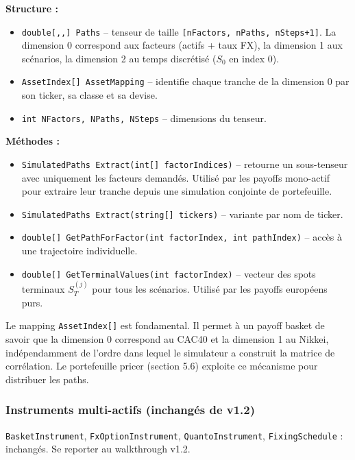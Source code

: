 \documentclass[a4paper,11pt]{article}
\newcommand{\cs}[1]{\texttt{\color{codeinline}#1}}
\begin{document}
\textbf{Structure :}
\begin{itemize}[leftmargin=1.5em]
  \item \cs{double[,,] Paths} -- tenseur de taille \cs{[nFactors, nPaths, nSteps+1]}.
        La dimension 0 correspond aux facteurs (actifs + taux FX), la dimension 1
        aux sc\'enarios, la dimension 2 au temps discr\'etis\'e ($S_0$ en index 0).
  \item \cs{AssetIndex[] AssetMapping} -- identifie chaque tranche de la dimension 0
        par son ticker, sa classe et sa devise.
  \item \cs{int NFactors, NPaths, NSteps} -- dimensions du tenseur.
\end{itemize}

\textbf{M\'ethodes :}
\begin{itemize}[leftmargin=1.5em]
  \item \cs{SimulatedPaths Extract(int[] factorIndices)} -- retourne un sous-tenseur
        avec uniquement les facteurs demand\'es. Utilis\'e par les payoffs mono-actif
        pour extraire leur tranche depuis une simulation conjointe de portefeuille.
  \item \cs{SimulatedPaths Extract(string[] tickers)} -- variante par nom de ticker.
  \item \cs{double[] GetPathForFactor(int factorIndex, int pathIndex)} -- acc\`es \`a une
        trajectoire individuelle.
  \item \cs{double[] GetTerminalValues(int factorIndex)} -- vecteur des spots terminaux
        $S_T^{(j)}$ pour tous les sc\'enarios. Utilis\'e par les payoffs europ\'eens purs.
\end{itemize}

\begin{tcolorbox}[note]
Le mapping \cs{AssetIndex[]} est fondamental. Il permet \`a un payoff basket de savoir
que la dimension 0 correspond au CAC40 et la dimension 1 au Nikkei, ind\'ependamment
de l'ordre dans lequel le simulateur a construit la matrice de corr\'elation.
Le portefeuille pricer (section 5.6) exploite ce m\'ecanisme pour distribuer les paths.
\end{tcolorbox}

\subsubsection{Instruments multi-actifs (inchang\'es de v1.2)}

\cs{BasketInstrument}, \cs{FxOptionInstrument}, \cs{QuantoInstrument},
\cs{FixingSchedule} : inchang\'es. Se reporter au walkthrough v1.2.
\end{document}
